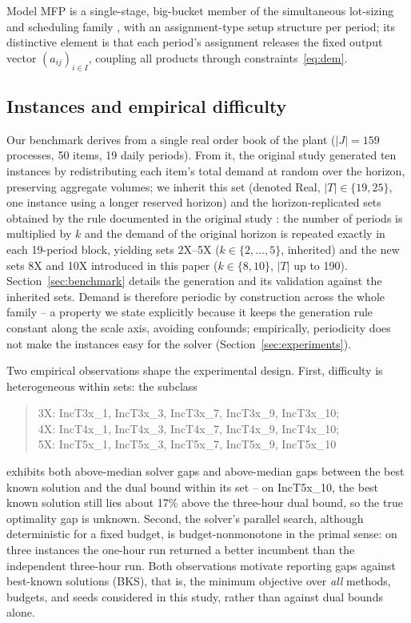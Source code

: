 

Model MFP is a single-stage, big-bucket member of the simultaneous
lot-sizing and scheduling family \citep{copil2017simultaneous}, with
an assignment-type setup structure per period; its distinctive
element is that each period's assignment releases the fixed output
vector $(a_{ij})_{i\in I}$, coupling all products through
constraints~\eqref{eq:dem}.

\subsection{Instances and empirical difficulty}
\label{sec:difficulty}

Our benchmark derives from a single real order book of the plant
($|J|=159$ processes, 50 items, 19 daily periods). From it, the
original study generated ten instances by redistributing each item's
total demand at random over the horizon, preserving aggregate volumes;
we inherit this set (denoted Real, $|T|\in\{19,25\}$, one instance
using a longer reserved horizon) and the horizon-replicated
sets obtained by the rule documented in the original study
\citep[Section~6.2.2]{daleluche2011tese}: the number of periods is multiplied by
$k$ and the demand of the original horizon is repeated exactly in
each 19-period block, yielding sets 2X--5X ($k\in\{2,\dots,5\}$,
inherited) and the new sets 8X and 10X introduced in this paper
($k\in\{8,10\}$, $|T|$ up to 190). Section~\ref{sec:benchmark}
details the generation and its validation against the inherited
sets. Demand is therefore periodic by construction across the whole
family -- a property we state explicitly because it keeps the
generation rule constant along the scale axis, avoiding confounds;
empirically, periodicity does not make the instances easy for the
solver (Section~\ref{sec:experiments}).

Two empirical observations shape the experimental design. First,
difficulty is heterogeneous within sets: the subclass
%
\begin{quote}\footnotesize
3X: IncT3x\_1, IncT3x\_3, IncT3x\_7, IncT3x\_9, IncT3x\_10;\\
4X: IncT4x\_1, IncT4x\_3, IncT4x\_7, IncT4x\_9, IncT4x\_10;\\
5X: IncT5x\_1, IncT5x\_3, IncT5x\_7, IncT5x\_9, IncT5x\_10
\end{quote}
%
exhibits both above-median solver gaps and above-median gaps between
the best known solution and the dual bound
within its set -- on
IncT5x\_10, the best known solution still lies about 17\% above the
three-hour dual bound, so the true optimality gap is unknown.
Second, the solver's parallel search, although deterministic for a
fixed budget, is budget-nonmonotone in the primal sense: on three
instances the one-hour run returned a better incumbent than the
independent three-hour run. Both observations motivate reporting
gaps against best-known solutions (BKS), that is, the minimum
objective over \emph{all} methods, budgets, and seeds considered in
this study, rather than against dual bounds alone.
